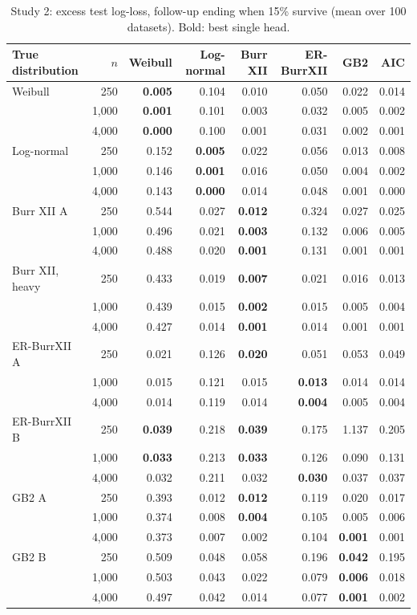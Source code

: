 \begin{table}[htbp]
\centering
\caption{Study 2: excess test log-loss, follow-up ending when 15\% survive (mean over 100 datasets). Bold: best single head.}\label{stab:misspec_ll_admin15}
\small
\begin{tabular}{lrrrrrrr}
\toprule
True distribution & $n$ & Weibull & Log-normal & Burr XII & ER-BurrXII & GB2 & AIC \\
\midrule
Weibull & 250 & \textbf{0.005} & 0.104 & 0.010 & 0.050 & 0.022 & 0.014 \\
 & 1,000 & \textbf{0.001} & 0.101 & 0.003 & 0.032 & 0.005 & 0.002 \\
 & 4,000 & \textbf{0.000} & 0.100 & 0.001 & 0.031 & 0.002 & 0.001 \\
Log-normal & 250 & 0.152 & \textbf{0.005} & 0.022 & 0.056 & 0.013 & 0.008 \\
 & 1,000 & 0.146 & \textbf{0.001} & 0.016 & 0.050 & 0.004 & 0.002 \\
 & 4,000 & 0.143 & \textbf{0.000} & 0.014 & 0.048 & 0.001 & 0.000 \\
Burr XII A & 250 & 0.544 & 0.027 & \textbf{0.012} & 0.324 & 0.027 & 0.025 \\
 & 1,000 & 0.496 & 0.021 & \textbf{0.003} & 0.132 & 0.006 & 0.005 \\
 & 4,000 & 0.488 & 0.020 & \textbf{0.001} & 0.131 & 0.001 & 0.001 \\
Burr XII, heavy & 250 & 0.433 & 0.019 & \textbf{0.007} & 0.021 & 0.016 & 0.013 \\
 & 1,000 & 0.439 & 0.015 & \textbf{0.002} & 0.015 & 0.005 & 0.004 \\
 & 4,000 & 0.427 & 0.014 & \textbf{0.001} & 0.014 & 0.001 & 0.001 \\
ER-BurrXII A & 250 & 0.021 & 0.126 & \textbf{0.020} & 0.051 & 0.053 & 0.049 \\
 & 1,000 & 0.015 & 0.121 & 0.015 & \textbf{0.013} & 0.014 & 0.014 \\
 & 4,000 & 0.014 & 0.119 & 0.014 & \textbf{0.004} & 0.005 & 0.004 \\
ER-BurrXII B & 250 & \textbf{0.039} & 0.218 & \textbf{0.039} & 0.175 & 1.137 & 0.205 \\
 & 1,000 & \textbf{0.033} & 0.213 & \textbf{0.033} & 0.126 & 0.090 & 0.131 \\
 & 4,000 & 0.032 & 0.211 & 0.032 & \textbf{0.030} & 0.037 & 0.037 \\
GB2 A & 250 & 0.393 & 0.012 & \textbf{0.012} & 0.119 & 0.020 & 0.017 \\
 & 1,000 & 0.374 & 0.008 & \textbf{0.004} & 0.105 & 0.005 & 0.006 \\
 & 4,000 & 0.373 & 0.007 & 0.002 & 0.104 & \textbf{0.001} & 0.001 \\
GB2 B & 250 & 0.509 & 0.048 & 0.058 & 0.196 & \textbf{0.042} & 0.195 \\
 & 1,000 & 0.503 & 0.043 & 0.022 & 0.079 & \textbf{0.006} & 0.018 \\
 & 4,000 & 0.497 & 0.042 & 0.014 & 0.077 & \textbf{0.001} & 0.002 \\
\bottomrule
\end{tabular}
\end{table}
